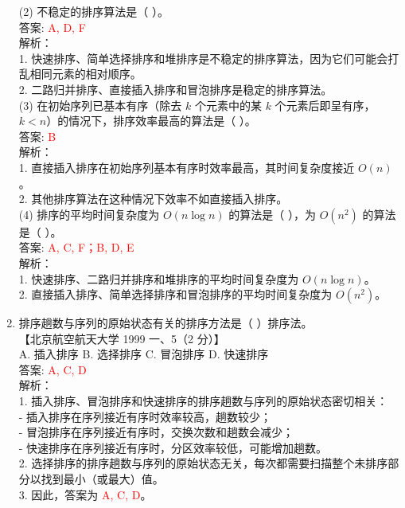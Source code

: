 \documentclass[lang=cn,newtx,10pt,scheme=chinese]{../../../elegantbook}
\begin{document}
\begin{enumerate}
    (2) 不稳定的排序算法是（ ）。 \\  
    答案: \textcolor{red}{A, D, F} \\  
    解析：\\
    1. 快速排序、简单选择排序和堆排序是不稳定的排序算法，因为它们可能会打乱相同元素的相对顺序。\\
    2. 二路归并排序、直接插入排序和冒泡排序是稳定的排序算法。\\

    (3) 在初始序列已基本有序（除去 $k$ 个元素中的某 $k$ 个元素后即呈有序，$k < n$）的情况下，排序效率最高的算法是（ ）。 \\  
    答案: \textcolor{red}{B} \\  
    解析：\\
    1. 直接插入排序在初始序列基本有序时效率最高，其时间复杂度接近 $O(n)$。\\
    2. 其他排序算法在这种情况下效率不如直接插入排序。\\

    (4) 排序的平均时间复杂度为 $O(n \log n)$ 的算法是（ ），为 $O(n^2)$ 的算法是（ ）。 \\  
    答案: \textcolor{red}{A, C, F；B, D, E} \\  
    解析：\\
    1. 快速排序、二路归并排序和堆排序的平均时间复杂度为 $O(n \log n)$。\\
    2. 直接插入排序、简单选择排序和冒泡排序的平均时间复杂度为 $O(n^2)$。\\ 

    \item 排序趟数与序列的原始状态有关的排序方法是（ ）排序法。\\
    【北京航空航天大学 1999 一、5（2 分）】\\

    A. 插入排序 \quad B. 选择排序 \quad C. 冒泡排序 \quad D. 快速排序 \\

    答案: \textcolor{red}{A, C, D} \\

    解析：\\
    1. 插入排序、冒泡排序和快速排序的排序趟数与序列的原始状态密切相关：\\
       - 插入排序在序列接近有序时效率较高，趟数较少；\\
       - 冒泡排序在序列接近有序时，交换次数和趟数会减少；\\
       - 快速排序在序列接近有序时，分区效率较低，可能增加趟数。\\
    2. 选择排序的排序趟数与序列的原始状态无关，每次都需要扫描整个未排序部分以找到最小（或最大）值。\\
    3. 因此，答案为 \textcolor{red}{A, C, D}。\\


\end{enumerate}
\end{document}
